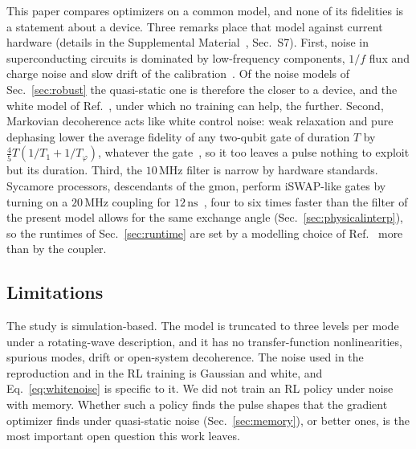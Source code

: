 \documentclass[aps,prx,twocolumn,superscriptaddress,nofootinbib,amsmath,amssymb,floatfix]{revtex4-2}
\newcommand{\ns}{\,\mathrm{ns}}
\newcommand{\MHz}{\,\mathrm{MHz}}
\begin{document}
This paper compares optimizers on a common model, and none of its fidelities is a statement about a
device. Three remarks place that model against current hardware (details in the Supplemental Material~\cite{supp},
Sec.~S7). First, noise in superconducting circuits is dominated by low-frequency components, $1/f$ flux
and charge noise and slow drift of the calibration~\cite{Krantz2019,Paladino2014}. Of the noise models of
Sec.~\ref{sec:robust} the quasi-static one is therefore the closer to a device, and the white model of
Ref.~\cite{Niu2019}, under which no training can help, the further. Second, Markovian decoherence acts
like white control noise: weak relaxation and pure dephasing lower the average fidelity of any two-qubit
gate of duration $T$ by $\tfrac{4}{5}T(1/T_1+1/T_\varphi)$, whatever the gate~\cite{Abad2022}, so it too
leaves a pulse nothing to exploit but its duration. Third, the $10\MHz$ filter is narrow by hardware
standards. Sycamore processors, descendants of the gmon, perform iSWAP-like gates by turning on a $20\MHz$
coupling for $12\ns$~\cite{Arute2019}, four to six times faster than the filter of the present model
allows for the same exchange angle (Sec.~\ref{sec:physicalinterp}), so the runtimes of
Sec.~\ref{sec:runtime} are set by a modelling choice of Ref.~\cite{Niu2019} more than by the coupler.

\subsection{Limitations}

The study is simulation-based. The model is truncated to three levels per mode under a rotating-wave
description, and it has no transfer-function nonlinearities, spurious modes, drift or open-system
decoherence. The noise used in the reproduction and in the RL training is Gaussian and white, and
Eq.~\eqref{eq:whitenoise} is specific to it. We did not train an RL policy under noise with memory.
Whether such a policy finds the pulse shapes that the gradient optimizer finds under quasi-static noise
(Sec.~\ref{sec:memory}), or better ones, is the most important open question this work leaves.
\end{document}
